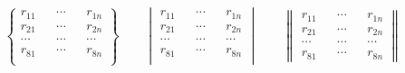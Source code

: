 \documentclass{cumcmthesis}
\begin{document}
\begin{appendices}
\begin{equation}
    \begin{Bmatrix} 
        r_{11}  &&  \cdots  &&  r_{1n}  \\
        r_{21}  &&  \cdots  &&  r_{2n}  \\ 
        \cdots  &&  \cdots  &&  \cdots  \\
        r_{81}  &&  \cdots  &&  r_{8n}  \\
    \end{Bmatrix} 
    \quad\quad
    \begin{vmatrix} 
        r_{11}  &&  \cdots  &&  r_{1n}  \\
        r_{21}  &&  \cdots  &&  r_{2n}  \\ 
        \cdots  &&  \cdots  &&  \cdots  \\
        r_{81}  &&  \cdots  &&  r_{8n}  \\
    \end{vmatrix} 
    \quad\quad
    \begin{Vmatrix} 
        r_{11}  &&  \cdots  &&  r_{1n}  \\
        r_{21}  &&  \cdots  &&  r_{2n}  \\ 
        \cdots  &&  \cdots  &&  \cdots  \\
        r_{81}  &&  \cdots  &&  r_{8n}  
    \end{Vmatrix}     
\end{equation}



\end{appendices}
\end{document}
